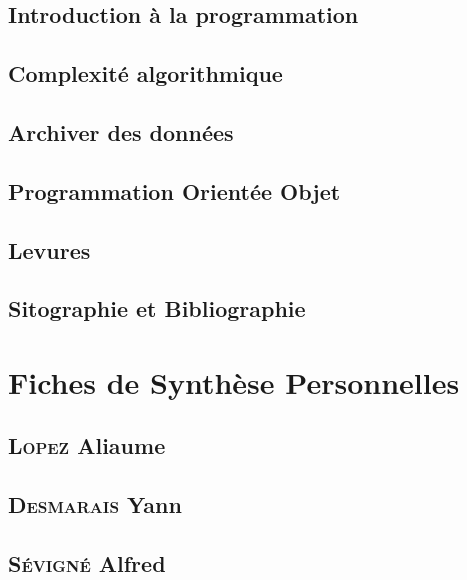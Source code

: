 \documentclass[a4paper,15pt]{report}
\begin{document}
\begin{appendix}

\chapter{Introduction à la programmation}
  
\chapter{Complexité algorithmique}

\chapter{Archiver des données}
	
\chapter{Programmation Orientée Objet}
	

\chapter{Levures}
	

\end{appendix}

\chapter{Sitographie et Bibliographie}
  
  
  
\part*{Fiches de Synthèse Personnelles}
  \chapter*{\textsc{Lopez} Aliaume}
    
  \chapter*{\textsc{Desmarais} Yann}
  \chapter*{\textsc{Sévigné} Alfred}
    
\end{document}
